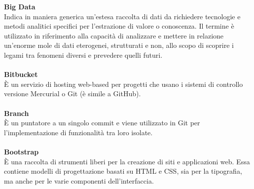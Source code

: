 \textbf{Big Data}\\
Indica in maniera generica un'estesa raccolta di dati da richiedere tecnologie e metodi analitici specifici per l'estrazione di valore o conoscenza. Il termine è utilizzato in riferimento alla capacità di analizzare  e mettere in relazione un'enorme mole di dati eterogenei, strutturati e non, allo scopo di scoprire i legami tra fenomeni diversi e prevedere quelli futuri. \\ \\
\textbf{Bitbucket}\\
È un servizio di hosting web-based per progetti che usano i sistemi di controllo versione Mercurial o Git (è simile a GitHub). \\ \\
\textbf{Branch}\\
È un puntatore a un singolo commit e viene utilizzato in Git per l'implementazione di funzionalità tra loro isolate. \\ \\
\textbf{Bootstrap}\\
È una raccolta di strumenti liberi per la creazione di siti e applicazioni web. Essa contiene modelli di progettazione basati su HTML e CSS, sia per la tipografia, ma anche per le varie componenti dell'interfaccia. \\ \\
\clearpage